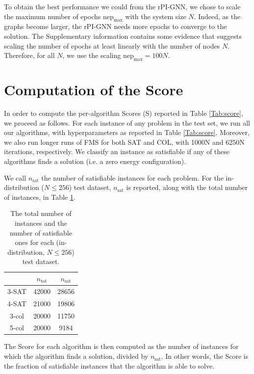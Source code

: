 \documentclass{article}
\begin{document}
To obtain the best performance we could from the rPI-GNN, we chose to scale the maximum number of epochs $\text{nep}_{\text{max}}$ with the system size $N$. Indeed, as the graphs become larger, the rPI-GNN needs more epochs to converge to the solution. The Supplementary information contains some evidence that suggests scaling the number of epochs at least linearly with the number of nodes $N$. Therefore, for all $N$, we use the scaling $\text{nep}_{\text{max}}=100N$.

\section{Computation of the Score}
\label{sec:Score}


In order to compute the per-algorithm Scores (S) reported in Table \ref{Tab:score}, we proceed as follows. For each instance of any problem in the test set, we run all our algorithms, with hyperparameters as reported in Table \ref{Tab:score}. Moreover, we also run longer runs of FMS for both SAT and COL, with 1000N and 6250N iterations, respectively. We classify an instance as satisfiable if any of these algorithms finds a solution (i.e. a zero energy configuration).

We call $n_{\text{sat}}$ the number of satisfiable instances for each problem.
For the in-distribution ($N\leq 256$) test dataset, $n_{\text{sat}}$ is reported, along with the total number of instances, in Table \ref{Tab:nsat}.

\begin{table}[H]
\begin{center}
\begin{tabular}{c|c|c}
 & $n_{\text{tot}}$ & $n_{\text{sat}}$ \\
\hline
3-SAT & 42000 & 28656 \\
4-SAT & 21000 & 19806 \\
3-col & 20000 & 11750 \\
5-col & 20000 & 9184 \\
\end{tabular}
\end{center}
\caption{The total number of instances and the number of satisfiable ones for each (in-distribution, $N\leq256$) test dataset.}
\label{Tab:nsat}
\end{table}

The Score for each algorithm is then computed as the number of instances for which the algorithm finds a solution, divided by $n_{\text{sat}}$. 
In other words, the Score is the fraction of satisfiable instances that the algorithm is able to solve.
\end{document}
